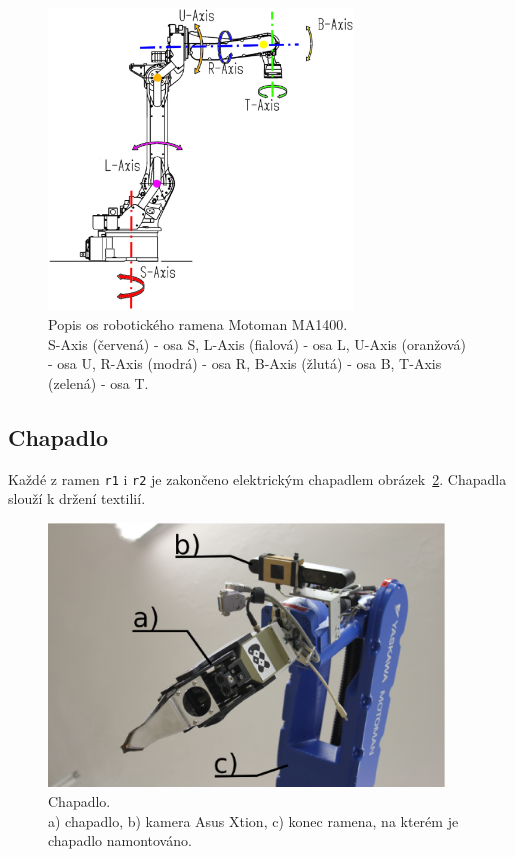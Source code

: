 \documentclass[10pt,a4paper,titlepage,oneside]{report}
\begin{document}
\begin{figure}[H]
	\centering  	
  	\includegraphics[height=8cm]{pictures/motomanMA1400axis.eps}
  	\caption[]{Popis os robotického ramena Motoman MA1400.\\ 
  	S-Axis (červená) - osa S, 
  	L-Axis (fialová) - osa L, 
  	U-Axis (oranžová) - osa U, 
  	R-Axis (modrá) - osa R, 
  	B-Axis (žlutá) - osa B,
  	T-Axis (zelená) - osa T.}
  	\label{fig:motomanAxis}
\end{figure}

\subsection{Chapadlo}
\label{subsec:gripper}
Každé z ramen \verb|r1| i \verb|r2| je zakončeno elektrickým chapadlem obrázek~\ref{fig:gripper}. Chapadla slouží k držení textilií.

\begin{figure}[H]
	\centering  	
  	\includegraphics[height=7cm]{pictures/gripperXtion.eps}
  	\caption[]{Chapadlo.\\a) chapadlo, b) kamera Asus Xtion, c) konec ramena, na kterém je chapadlo namontováno.	  	
  	}
  	\label{fig:gripper}
\end{figure}
\end{document}
